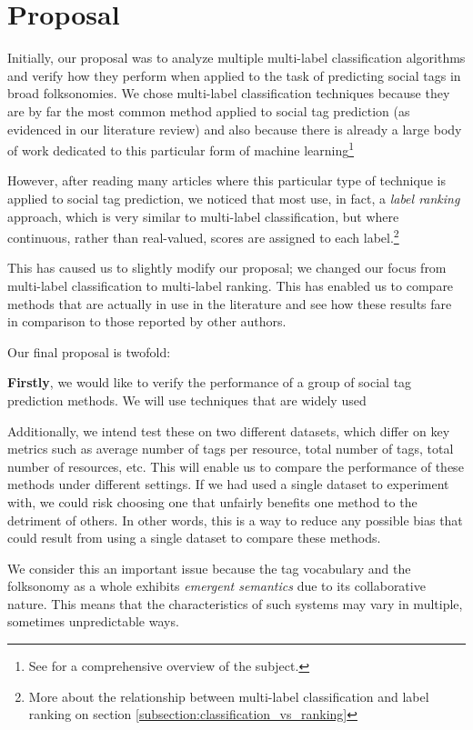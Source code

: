 \chapter{Proposal}\label{chap:proposal}

Initially, our proposal was to analyze multiple multi-label classification algorithms and verify how they perform when applied to the task of predicting social tags in broad folksonomies. We chose multi-label classification techniques because they are by far the most common method applied to social tag prediction (as evidenced in our literature review) and also because there is already a large body of work dedicated to this particular form of machine learning\footnote{See \cite{tsoumakas_katakis_2007} for a comprehensive overview of the subject.}

However, after reading many articles where this particular type of technique is applied to social tag prediction, we noticed that most use, in fact, a \textit{label ranking} approach, which is very similar to multi-label classification, but where continuous, rather than real-valued, scores are assigned to each label.\footnote{More about the relationship between multi-label classification and label ranking on section \ref{subsection:classification_vs_ranking}}

This has caused us to slightly modify our proposal; we changed our focus from multi-label classification to multi-label ranking. This has enabled us to compare methods that are actually in use in the literature and see how these results fare in comparison to those reported by other authors.

Our final proposal is twofold:

\textbf{Firstly}, we would like to verify the performance of a group of social tag prediction methods. We will use techniques that are widely used 


Additionally, we intend test these on two different datasets, which differ on key metrics such as average number of tags per resource, total number of tags, total number of resources, etc. This will enable us to compare the performance of these methods under different settings. If we had used a single dataset to experiment with, we could risk choosing one that unfairly benefits one method to the detriment of others. In other words, this is a way to reduce any possible bias that could result from using a single dataset to compare these methods.

We consider this an important issue because the tag vocabulary and the folksonomy as a whole exhibits \textit{emergent semantics} \citep{cattuto_etal_2007,koerner_etal_2010} due to its collaborative nature. This means that the characteristics of such systems may vary in multiple, sometimes unpredictable ways.


